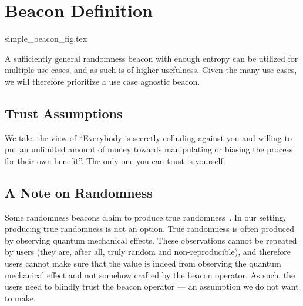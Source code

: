 

\section{Beacon Definition}



{simple_beacon_fig.tex}

A sufficiently general randomness beacon with enough entropy can be utilized for multiple use cases, and as such is of higher usefulness. Given the many use cases, we will therefore prioritize a use case agnostic beacon.

\subsection{Trust Assumptions}

We take the view of \enquote{Everybody is secretly colluding against you and willing to put an unlimited amount of money towards manipulating or biasing the process for their own benefit}. The only one you can trust is yourself.

\subsection{A Note on Randomness}
Some randomness beacons claim to produce true randomness~\cite{nistbeacon}. In our setting, producing true randomness is not an option. True randomness is often produced by observing quantum mechanical effects. These observations cannot be repeated by users (they are, after all, truly random and non-reproducible), and therefore users cannot make sure that the value is indeed from observing the quantum mechanical effect and not somehow crafted by the beacon operator. As such, the users need to blindly trust the beacon operator  --- an assumption we do not want to make.

